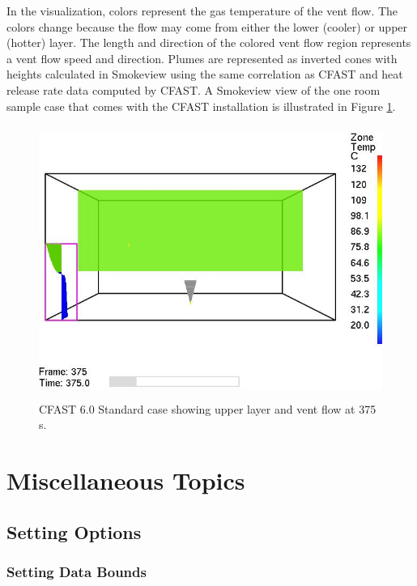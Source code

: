 \documentclass[11pt,twoside]{book}
\newcommand{\figoptions}{hbp}
\begin{document}
In the visualization, colors represent the gas temperature of the vent flow.  The colors change because the flow may come from either the lower (cooler) or upper (hotter) layer.   The length and direction of the colored vent flow region represents a vent flow speed and direction.  Plumes are represented as inverted cones with heights calculated in Smokeview using the same correlation as CFAST and heat release rate data computed by CFAST.
A Smokeview view of the one room sample case that comes with the CFAST installation is illustrated in Figure \ref{figcfast}.

\begin{figure}[\figoptions]
\begin{center}
\includegraphics[height=3.5in]{figures/standard_0375}
\end{center}
\caption{CFAST 6.0 Standard case showing upper layer and vent flow at 375 s.}
\label{figcfast}%
\end{figure}

\part{Miscellaneous Topics}


\chapter{Setting Options}
\section{Setting Data Bounds}
\end{document}

